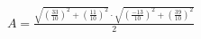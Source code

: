 \documentclass[preview]{standalone}
\begin{document}
\begin{align*}
A=\frac{\sqrt{(\frac{33}{10})^2+(\frac{11}{10})^2} \cdot \sqrt{(\frac{-13}{10})^2+(\frac{39}{10})^2}}{2}
\end{align*}
\end{document}
